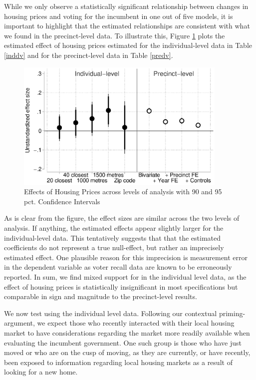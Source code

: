 \documentclass[12pt,a4paper]{article}
\begin{document}
	While we only observe a statistically significant relationship between changes in housing prices and voting for the incumbent in one out of five models, it is important to highlight that the estimated relationships are consistent with what we found in the precinct-level data. To illustrate this, Figure \ref{comparison} plots the estimated effect of housing prices estimated for the individual-level data in Table \ref{inddv} and for the precinct-level data in Table \ref{predv}.
	
	\begin{figure}[htbp!]
		\includegraphics[width=0.9\textwidth]{../figures/comparison.eps}
		\centering
		\caption{Effects of Housing Prices across levels of analysis with 90  and 95 pct. Confidence Intervals}\label{comparison}
	\end{figure}
	
	As is clear from the figure, the effect sizes are similar across the two levels of analysis. If anything, the estimated effects appear slightly larger for the individual-level data. This tentatively suggests that that the estimated coefficients do not represent a true null-effect, but rather an imprecisely estimated effect. One plausible reason for this imprecision is measurement error in the dependent variable as voter recall data are known to be erroneously reported. In sum, we find mixed support for \hone in the individual level data, as the effect of housing prices is statistically insignificant in most specifications but comparable in sign and magnitude to the precinct-level results.
	
	We now test \htwo using the individual level data. Following our contextual priming-argument, we expect those who recently interacted with their local housing market to have considerations regarding the market more readily available when evaluating the incumbent government. One such group is those who have just moved or who are on the cusp of moving, as they are currently, or have recently, been exposed to information regarding local housing markets as a result of looking for a new home. 
	
\end{document}
